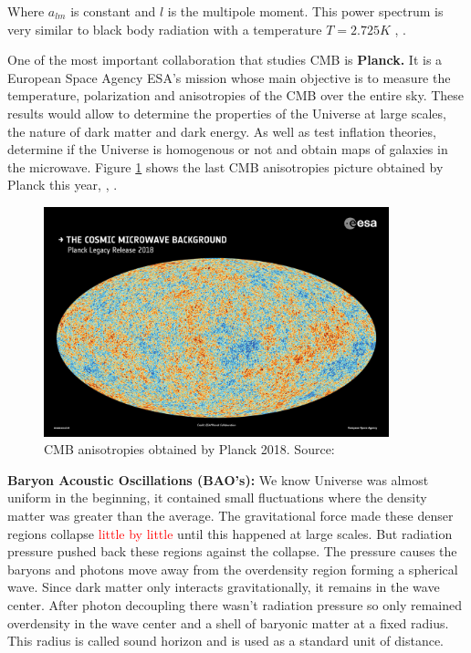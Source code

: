 \documentclass[onecolumn,           %
               showpacs,            %
               preprintnumbers,     %
               aps,                 %
               letterpaper,             %
               superscriptaddress,      %
               nofootinbib,         %
               tightenlines,        %
               floats,floatfix      %
               ,usenatbib,
               ]{revtex4-1}
\begin{document}
Where $a_{lm}$ is constant and $l$ is the multipole moment. This power spectrum is very similar to black body radiation with a temperature $T = 2.725K$ \cite{CMB1}, \cite{CMB2}.


One of the most important collaboration that studies CMB is \textbf{Planck.} It is a European Space Agency ESA's mission whose main objective is to measure the temperature, polarization and anisotropies of the CMB over the entire sky. These results would allow to determine the properties of the Universe at large scales, the nature of dark matter and dark energy. As well as test inflation theories, determine if the Universe is homogenous or not and obtain maps of galaxies in the microwave. Figure \ref{CMBPlanck} shows the last CMB anisotropies picture obtained by Planck this year\cite{Planck1}, \cite{Planck2}, \cite{Planck3}.\\

\begin{figure}[h]
	\centering
	\includegraphics[width=10cm]{FiguresCosmo/CMB.jpg}	
	\caption{CMB anisotropies obtained by Planck 2018. Source:\cite{Planck4}}
	\label{CMBPlanck}
\end{figure}

\textbf{Baryon Acoustic Oscillations (BAO's):} We know Universe was almost uniform in the beginning, it contained small fluctuations where the density matter was greater than the average. The gravitational force made these denser regions collapse \textcolor{red}{little by little} until this happened at large scales. But radiation pressure pushed back these regions against the collapse. The pressure causes the baryons and photons move away from the overdensity region forming a spherical wave. Since dark matter only interacts gravitationally, it remains in the wave center. After photon decoupling there wasn't radiation pressure so only remained overdensity in the wave center and a shell of baryonic matter at a fixed radius. This radius is called sound horizon and is used as a standard unit of distance. 
\end{document}

